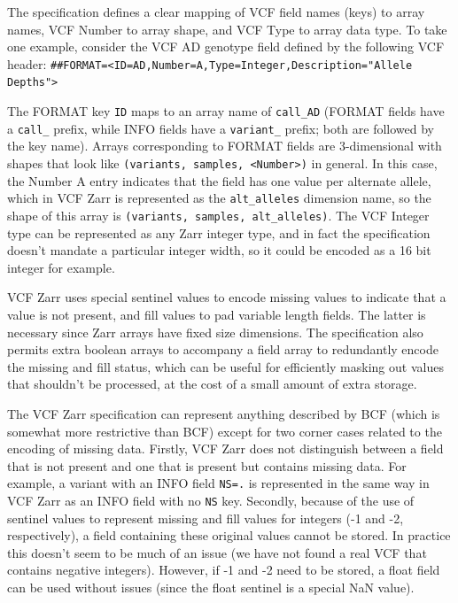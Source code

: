 \documentclass[a4paper,num-refs]{oup-contemporary}
\begin{document}
The specification defines a clear mapping of VCF field names (keys) to
array names, VCF Number to array shape, and VCF Type to array data type.
To take one example, consider the VCF AD genotype field defined by the
following VCF header: \texttt{\#\#FORMAT=<ID=AD,Number=A,Type=Integer,Description="Allele Depths">}

The FORMAT key \texttt{ID} maps to an array name of \texttt{call\_AD}
(FORMAT fields have a \texttt{call\_} prefix, while INFO fields have a
\texttt{variant\_} prefix; both are followed by the key name). Arrays
corresponding to FORMAT fields are 3-dimensional with shapes that look
like \texttt{(variants, samples, <Number>)} in general. In this case, the
Number A entry indicates that the field has one value per alternate allele,
which in VCF Zarr is represented as the \texttt{alt\_alleles} dimension name,
so the shape of this array is \texttt{(variants, samples, alt\_alleles)}.
The VCF Integer type can be represented as any Zarr integer type, and in
fact the specification doesn't mandate a particular integer width, so it
could be encoded as a 16 bit integer for example.

VCF Zarr uses special sentinel values to encode missing values to indicate
that a value is not present, and fill values to pad variable length fields.
The latter is necessary since Zarr arrays have fixed size dimensions. The
specification also permits extra boolean arrays to accompany a field array
to redundantly encode the missing and fill status, which can be useful for
efficiently masking out values that shouldn't be processed, at the cost of
a small amount of extra storage.

The VCF Zarr specification can represent anything described by BCF
(which is somewhat more restrictive than BCF) except for two corner
cases related to the encoding of missing data. Firstly, VCF Zarr does
not distinguish between a field that is not present and one that 
is present but contains missing data. For example, a variant with an
INFO field \texttt{NS=.} is represented in the same way in VCF Zarr
as an INFO field with no \texttt{NS} key. Secondly, because of the use
of sentinel values to represent missing and fill values for integers
(-1 and -2, respectively), a field containing these original values
cannot be stored. In practice this doesn't seem to be much of 
an issue (we have not found a real VCF that contains negative 
integers). However, if -1 and -2 need to be stored, a float field
can be used without issues (since the float sentinel is a special NaN
value).
\end{document}
